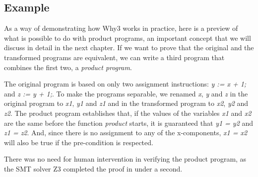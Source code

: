 \subsection{Example}
\label{subsec:why3_example}

As a way of demonstrating how Why3 works in practice, here is a preview of what is possible to do with product programs, an important concept that we will discuss in detail in the next chapter.
If we want to prove that the original and the transformed programs are equivalent, we can write a third program that combines the first two, a \emph{product program}.

The original program is based on only two assignment instructions: \emph{y := x + 1;} and \emph{z := y + 1;}.
To make the programs separable, we renamed \emph{x}, \emph{y} and \emph{z} in the original program to \emph{x1}, \emph{y1} and \emph{z1} and in the transformed program to \emph{x2}, \emph{y2} and \emph{z2}.
The product program establishes that, if the values of the variables \emph{x1} and \emph{x2} are the same before the function \emph{product} starts, it is guaranteed that \emph{y1 = y2} and \emph{z1 = z2}.
And, since there is no assignment to any of the x-components, \emph{x1 = x2} will also be true if the pre-condition is respected.

There was no need for human intervention in verifying the product program, as the SMT solver Z3 completed the proof in under a second.


